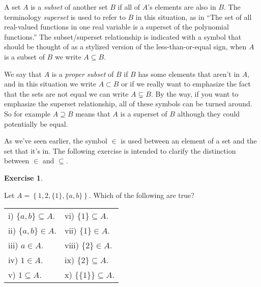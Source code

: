 \documentclass[10pt,]{book}
\theoremstyle{plain}
\theoremstyle{definition}
\theoremstyle{definition}
\newtheorem{exercise}[theorem]{Exercise}
\numberwithin{equation}{section}
\begin{document}
    A set \(A\) is a \emph{subset} of another set \(B\) if all of \(A\)'s elements
    are also in \(B\). The terminology
    \emph{superset} is used to refer
    to \(B\) in this situation, as in ``The set of all real-valued functions
    in one real variable is a superset of the polynomial functions.'' The
    subset/superset relationship is indicated with a symbol that should be
    thought of as a stylized version of the less-than-or-equal sign, when
    \(A\) is a subset of \(B\) we write \(A \subseteq B\).
\par

    We say that \(A\) is
    a \emph{proper subset} of \(B\) if \(B\) has some elements that aren't in
    \(A\), and in this situation we write \(A \subset B\) or if we really want
    to emphasize the fact that the sets are not equal we can write
    \(A \subsetneq B\). By the way, if you want to emphasize the superset
    relationship, all of these symbols can be turned around. So for example
    \(A \supseteq B\) means that \(A\) is a superset of \(B\) although they could
    potentially be equal.
\par

    As we've seen earlier, the symbol \(\in\) is used between an element of
    a set and the set that it's in. The following exercise is intended to
    clarify the distinction between \(\in\) and \(\subseteq\).
\begin{exercise}\label{exercise-33}

        Let \(A = \left\{  1, 2, \{ 1 \}, \{ a, b \} \right\}\).
        Which of the following are true?
\begin{tabular}{ll}
i) \(\{ a, b \} \subseteq A\).&vi) \(\{ 1 \} \subseteq A\).\tabularnewline[0pt]
ii) \(\{ a, b \} \in A\).&vii) \(\{ 1 \} \in A\).\tabularnewline[0pt]
iii) \(a \in A\).&viii) \(\{ 2 \} \in A\).\tabularnewline[0pt]
iv) \(1 \in A\).&ix) \(\{ 2 \} \subseteq A\).\tabularnewline[0pt]
v) \(1 \subseteq A\).&x) \(\{\{1\}\} \subseteq A\).
\end{tabular}
\end{exercise}
\par
\end{document}
